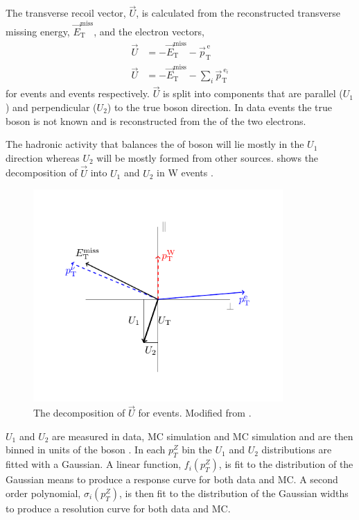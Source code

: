The transverse recoil vector, $\vec{U}$, is calculated from the reconstructed
transverse missing energy, $\vec{E}_{\mathrm{T}}^{\mathrm{miss}}$, and the
electron \pT vectors,
\begin{align}
\vec{U} &= - \vec{E}_{\mathrm{T}}^{\mathrm{miss}} 
      - \vec{p}^{\ \mathrm{e}}_{\mathrm{T}}\\
\vec{U} &= - \vec{E}_{\mathrm{T}}^{\mathrm{miss}} 
      - \sum_i \vec{p}^{\ \mathrm{e}_i}_{\mathrm{T}}
\end{align}
for \PW events and \PZ events respectively. $\vec{U}$ is split into components
that are parallel ($U_1$) and perpendicular ($U_2$) to the true boson \pT
direction. 
In \PZ data events the true boson \pT is not known and is reconstructed from the
\pT of the two electrons.

The hadronic activity that balances the \pT of boson will lie mostly in the
$U_1$ direction whereas $U_2$ will be mostly formed from other sources.
 shows the decomposition of $\vec{U}$ into $U_1$ and
$U_2$ in W events \cite{bauer2010modeling}.
\begin{figure}
  \begin{center}
    \includegraphics*[width=0.85\textwidth]{recoil}
    \caption[The decomposition of $\vec{U}$ for \PW events.] {The decomposition
of $\vec{U}$ for \PW events. Modified from \cite{bauer2010modeling}.}
    \label{fig:recoil}
  \end{center}
\end{figure}

$U_1$ and $U_2$ are measured in \PZ data, \PZ MC simulation and \PW MC
simulation and are then binned in units of the boson \pT.  In each $p_T^{Z}$ bin
the $U_1$ and $U_2$ distributions are fitted with a Gaussian.  A linear function,
$f_i(p_T^Z)$, is fit to the distribution of the Gaussian means to produce a
response curve for both data and MC.  A second order polynomial,
$\sigma_i(p_T^Z)$, is then fit to the distribution of the Gaussian widths to
produce a resolution curve for both data and MC\cite{bauer2010modeling}.

